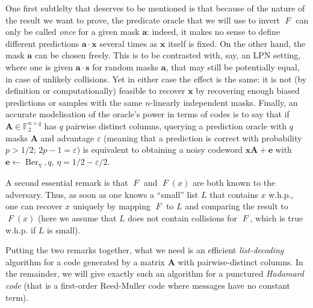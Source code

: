\documentclass[11pt,a4paper]{article}
\theoremstyle{definition}
\DeclareMathOperator\fun{\mathit{F}}
\DeclareMathOperator\Ber{Ber}
\newcommand\ftwo{\mathbb{F}_{2}}
\begin{document}
One first subtlelty that deserves to be mentioned is that because of the nature of the result we want to prove, the predicate oracle that we will use to invert $\fun$ can
only be called \emph{once} for a given mask $\bm{a}$: indeed, it makes no sense to define different predictions $\bm{a}\cdot\bm{x}$ several times as $\bm{x}$ itself is fixed. On the other
hand, the mask $\bm{a}$ can be chosen freely. This is to be contrasted with, say, an LPN setting, where one is given $\bm{a}\cdot\bm{s}$ for random masks $\bm{a}$, that may
still be potentially equal, in case of unlikely collisions. Yet in either case the effect is the same: it is not (by definition or computationally) feasible to recover $\bm{x}$ by recovering enough
biased predictions or samples with the same $n$-linearly independent masks. Finally, an accurate modelisation of the oracle's power in terms of codes is to say that if $\bm{A} \in \ftwo^{n\times q}$
has $q$ pairwise distinct columns, querying a prediction oracle with $q$ masks $\bm{A}$ and advantage $\varepsilon$ (meaning that a prediction is correct with probability
$p > 1/2$; $2p - 1 = \varepsilon$) is equivalent to obtaining a noisy codeword $\bm{x}\bm{A} + \bm{e}$ with $\bm{e} \leftarrow \Ber_\eta,q$, $\eta = 1/2 - \varepsilon/2$. 

A second essential remark is that $\fun$ and $\fun(x)$ are both known to the adversary. Thus, as soon as one knows a ``small'' list $L$ that contains $x$ w.h.p., one can recover
$x$ uniquely by mapping $\fun$ to $L$ and comparing the result to $\fun(x)$ (here we assume that $L$ does not contain collisions for $\fun$, which is true w.h.p. if $L$ is small).

Putting the two remarks together, what we need is an efficient \emph{list-decoding} algorithm for a code generated by a matrix $\bm{A}$ with pairwise-distinct columns. In the remainder,
we will give exactly such an algorithm for a punctured \emph{Hadamard code} (that is a first-order Reed-Muller code where messages have no constant term).






\end{document}
